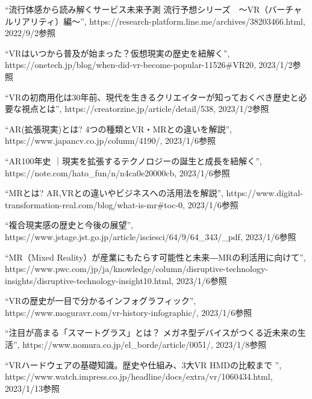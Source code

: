 \documentclass[12pt,a4j]{ltjsarticle}
\begin{document}
\clearpage
\begin{thebibliography}{99}
  ``流行体感から読み解くサービス未来予測 流行予想シリーズ　～VR（バーチャルリアリティ）編～'', https://research-platform.line.me/archives/38203466.html, 2022/9/2参照

  ``VRはいつから普及が始まった？仮想現実の歴史を紐解く'', https://onetech.jp/blog/when-did-vr-become-popular-11526\#VR20, 2023/1/2参照

  ``VRの初商用化は30年前、現代を生きるクリエイターが知っておくべき歴史と必要な視点とは'', https://creatorzine.jp/article/detail/538, 2023/1/2参照

  ``AR(拡張現実)とは? 4つの種類とVR・MRとの違いを解説'', https://www.japancv.co.jp/column/4190/, 2023/1/6参照

  ``AR100年史 ｜現実を拡張するテクノロジーの誕生と成長を紐解く'', https://note.com/hato\_fun/n/n4ca0e20000cb, 2023/1/6参照

  ``MRとは? AR,VRとの違いやビジネスへの活用法を解説'', https://www.digital-transformation-real.com/blog/what-is-mr\#toc-0, 2023/1/6参照

  ``複合現実感の歴史と今後の展望'', https://www.jstage.jst.go.jp/article/isciesci/64/9/64\_343/\_pdf, 2023/1/6参照

  ``MR（Mixed Reality）が産業にもたらす可能性と未来―MRの利活用に向けて'', https://www.pwc.com/jp/ja/knowledge/column/disruptive-technology-insights/disruptive-technology-insight10.html, 2023/1/6参照

  ``VRの歴史が一目で分かるインフォグラフィック'', https://www.moguravr.com/vr-history-infographic/, 2023/1/6参照

  ``注目が高まる「スマートグラス」とは？ メガネ型デバイスがつくる近未来の生活'', https://www.nomura.co.jp/el\_borde/article/0051/, 2023/1/8参照

  ``VRハードウェアの基礎知識。歴史や仕組み、3大VR HMDの比較まで
'', https://www.watch.impress.co.jp/headline/docs/extra/vr/1060434.html, 2023/1/13参照

\end{thebibliography}
\end{document}
